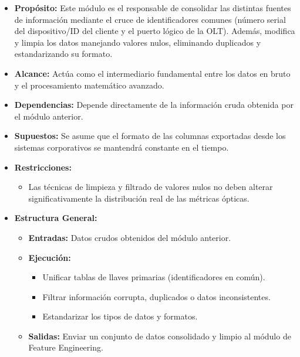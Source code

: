 \documentclass[12pt,a4paper]{article}
\begin{document}
    \begin{itemize}
        \item \textbf{Propósito:} Este módulo es el responsable de consolidar las distintas fuentes de información mediante el cruce de identificadores comunes (número serial del dispositivo/ID del cliente y el puerto lógico de la OLT). Además,
         modifica y limpia los datos manejando valores nulos, eliminando duplicados y estandarizando su formato.
        \item \textbf{Alcance:} Actúa como el intermediario fundamental entre los datos en bruto y el procesamiento matemático avanzado.
        \item \textbf{Dependencias:} Depende directamente de la información cruda obtenida por el módulo anterior.
        \item \textbf{Supuestos:} Se asume que el formato de las columnas exportadas desde los sistemas corporativos se mantendrá constante en el tiempo.
        \item \textbf{Restricciones:}
        \begin{itemize}
            \item Las técnicas de limpieza y filtrado de valores nulos no deben alterar significativamente la distribución real de las métricas ópticas.
        \end{itemize}
        \item \textbf{Estructura General:} 
        \begin{itemize}
            \item \textbf{Entradas:} Datos crudos obtenidos del módulo anterior.
            \item \textbf{Ejecución:} 
            \begin{itemize}
                \item Unificar tablas de llaves primarias (identificadores en común).
                \item Filtrar información corrupta, duplicados o datos inconsistentes.
                \item Estandarizar los tipos de datos y formatos.
            \end{itemize}
            \item \textbf{Salidas:} Enviar un conjunto de datos consolidado y limpio al módulo de Feature Engineering.
        \end{itemize}
    \end{itemize}
\end{document}
